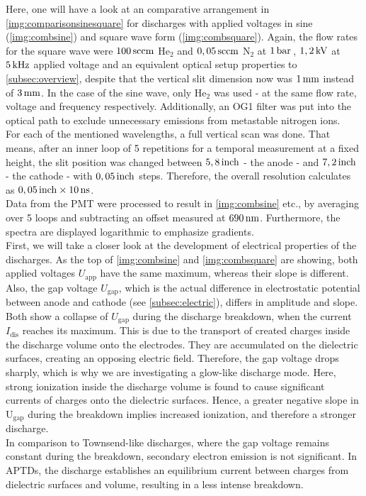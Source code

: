\documentclass[a4paper,10pt,twoside]{article}
\newcommand{\ix}[1]{_\text{#1}}
\begin{document}
			\begin{multicols*}{2}
				
				Here, one will have a look at an comparative arrangement in \autoref{img:comparisonsinesquare} for discharges with applied voltages in sine (\autoref{img:combsine}) and square wave form (\autoref{img:combsquare}). Again, the flow rates for the square wave were $\unit[100]{sccm}$ He$_2$ and $\unit[0,05]{sccm}$ N$_2$ at $\unit[1]{bar}$\,, $\unit[1,2]{kV}$ at $\unit[5]{kHz}$ applied voltage and an equivalent optical setup properties to \autoref{subsec:overview}, despite that the vertical slit dimension now was $\unit[1]{mm}$ instead of $\unit[3]{mm}$. In the case of the sine wave,	only He$_2$ was used - at the same flow rate, voltage and frequency respectively. Additionally, an OG1 filter was put into the optical path to exclude unnecessary emissions from metastable nitrogen ions.\\
				For each of the mentioned wavelengths, a full vertical scan was done. That means, after an inner loop of 5 repetitions for a temporal measurement at a fixed height, the slit position was changed between $\unit[5,8]{inch}$ - the anode - and $\unit[7,2]{inch}$ - the cathode - with $\unit[0,05]{inch}$ steps. Therefore, the overall resolution calculates as $\unit[0,05]{inch}\times\unit[10]{ns}$.\\
				Data from the PMT were processed to result in \autoref{img:combsine} etc., by averaging over 5 loops and subtracting an offset measured at $\unit[690]{nm}$. Furthermore, the spectra are displayed logarithmic to emphasize gradients.\\
				First, we will take a closer look at the development of electrical properties of the discharges. As the top of \autoref{img:combsine} and \autoref{img:combsquare} are showing, both applied voltages $U\ix{app}$ have the same maximum, whereas their slope is different. Also, the gap voltage $U\ix{gap}$, which is the actual difference in electrostatic potential between anode and cathode (see \autoref{subsec:electric}), differs in amplitude and slope. Both show a collapse of $U\ix{gap}$ during the discharge breakdown, when the current $I\ix{dis}$ reaches its maximum. This is due to the transport of created charges inside the discharge volume onto the electrodes. They are accumulated on the dielectric surfaces, creating an opposing electric field. Therefore, the gap voltage drops sharply, which is why we are investigating a glow-like discharge mode. Here, strong ionization inside the discharge volume is found to cause significant currents of charges onto the dielectric surfaces. Hence, a greater negative slope in U$\ix{gap}$ during the breakdown implies increased ionization, and therefore a stronger discharge.\\
				In comparison to Townsend-like discharges, where the gap voltage remains constant during the breakdown, secondary electron emission is not significant. In APTDs, the discharge establishes an equilibrium current between charges from dielectric surfaces and volume, resulting in a less intense breakdown.
				
			\end{multicols*}
				
\end{document}
